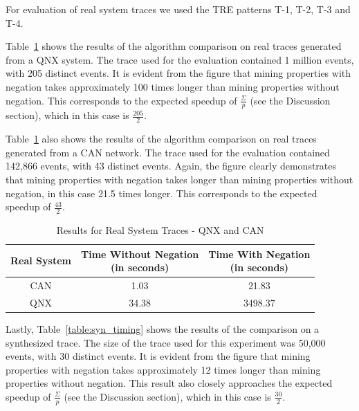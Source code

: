 \documentclass[]{sigplanconf}
\begin{document}
For evaluation of real system traces we used the TRE patterns T-1, T-2, T-3 and T-4.

Table~\ref{miningOverhead_time} shows the results of the algorithm comparison on real traces generated from a QNX system. The trace used for the evaluation contained 1 million events, with 205 distinct events. It is evident from the figure that mining properties with negation takes approximately 100 times longer than mining properties without negation. This corresponds to the expected speedup of $\frac{\Sigma}{p}$ (see the Discussion section), which in this case is $\frac{205}{2}$.

Table~\ref{miningOverhead_time} also shows the results of the algorithm comparison on real traces generated from a CAN network. The trace used for the evaluation contained 142,866 events, with 43 distinct events. Again, the figure clearly demonstrates that mining properties with negation takes longer than mining properties without negation, in this case 21.5 times longer. This corresponds to the expected speedup of $\frac{43}{2}$.


\begin{table}[ht]
	\centering
	\begin{adjustbox}{max width=\columnwidth}
		\begin{tabular}{|c|c|c|}
			\hline
			\textbf{Real System} & \textbf{Time Without Negation \newline (in seconds)} & \textbf{Time With Negation \newline (in seconds)} \\
			\hline
			 CAN & 1.03 & 21.83 \\
			 \hline
			 QNX & 34.38 & 3498.37\\
			 \hline
		\end{tabular}
	\end{adjustbox}
	\caption{Results for Real System Traces - QNX and CAN}
	\label{miningOverhead_time}
\end{table}


Lastly, Table~\ref{table:syn_timing} shows the results of the comparison on a synthesized trace. The size of the trace used for this experiment was 50,000 events, with 30 distinct events. It is evident from the figure that mining properties with negation takes approximately 12 times longer than mining properties without negation. This result also closely approaches the expected speedup of $\frac{\Sigma}{p}$ (see the Discussion section), which in this case is $\frac{30}{2}$.

\end{document}
